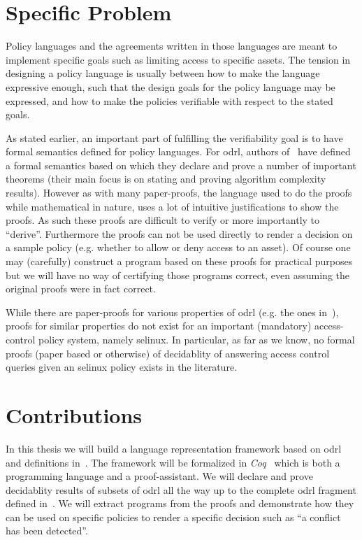 \section{Specific Problem}

Policy languages and the agreements written in those languages are meant to implement specific goals such as limiting access to specific assets. The tension in designing a policy language is usually between how to make the language expressive enough, such that the design goals for the policy language may be expressed, and how to make the policies verifiable with respect to the stated goals.

As stated earlier, an important part of fulfilling the verifiability goal is to have formal semantics defined for policy languages. For \ac{odrl}, authors of~\cite{pucella2006} have defined a formal semantics based on which they declare and prove a number of important theorems (their main focus is on stating and proving algorithm complexity results). However as with many paper-proofs, the language used to do the proofs while mathematical in nature, uses a lot of intuitive justifications to show the proofs. As such these proofs are difficult to verify or more importantly to ``derive''. Furthermore the proofs can not be used directly to render a decision on a sample policy (e.g. whether to allow or deny access to an asset). Of course one may (carefully) construct a program based on these proofs for practical purposes but we will have no way of certifying those programs correct, even assuming the original proofs were in fact correct.

While there are paper-proofs for various properties of \ac{odrl} (e.g. the ones in~\cite{pucella2006}), proofs for similar properties do not exist for an important (mandatory) access-control policy system, namely \ac{selinux}. In particular, as far as we know, no formal proofs (paper based or otherwise) of decidablity of answering access control queries given an \ac{selinux} policy exists in the literature. 


\section{Contributions}

In this thesis we will build a language representation framework based on \ac{odrl} and definitions in~\cite{pucella2006}. The framework will be formalized in \emph{Coq}~\cite{BC04} which is both a programming language and a proof-assistant. We will declare and prove decidablity results of subsets of \ac{odrl} all the way up to the complete \ac{odrl} fragment defined in~\cite{pucella2006}. We will extract programs from the proofs and demonstrate how they can be used on specific policies to render a specific decision such as ``a conflict has been detected''. 

